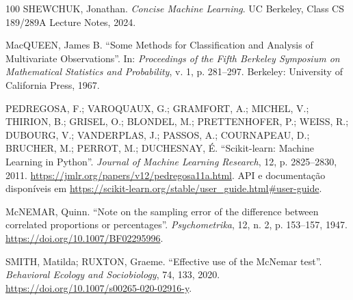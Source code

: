 \documentclass[msc]{on} %
\begin{document}
\begin{thebibliography}{100}
 SHEWCHUK, Jonathan. \textit{Concise Machine Learning}. UC Berkeley, Class CS 189/289A Lecture Notes, 2024.

 MacQUEEN, James B. ``Some Methods for Classification and Analysis of Multivariate Observations''. In: \emph{Proceedings of the Fifth Berkeley Symposium on Mathematical Statistics and Probability}, v. 1, p. 281--297. Berkeley: University of California Press, 1967.

PEDREGOSA, F.; VAROQUAUX, G.; GRAMFORT, A.; MICHEL, V.; THIRION, B.; GRISEL, O.; BLONDEL, M.; PRETTENHOFER, P.; WEISS, R.; DUBOURG, V.; VANDERPLAS, J.; PASSOS, A.; COURNAPEAU, D.; BRUCHER, M.; PERROT, M.; DUCHESNAY, É. ``Scikit-learn: Machine Learning in Python''. \emph{Journal of Machine Learning Research}, 12, p. 2825--2830, 2011. \url{https://jmlr.org/papers/v12/pedregosa11a.html}. API e documentação disponíveis em \url{https://scikit-learn.org/stable/user_guide.html#user-guide}.

McNEMAR, Quinn. ``Note on the sampling error of the difference between correlated proportions or percentages''. \emph{Psychometrika}, 12, n. 2, p. 153--157, 1947. \url{https://doi.org/10.1007/BF02295996}.

SMITH, Matilda; RUXTON, Graeme. ``Effective use of the McNemar test''. \emph{Behavioral Ecology and Sociobiology}, 74, 133, 2020. \url{https://doi.org/10.1007/s00265-020-02916-y}.
%




\end{thebibliography}
\end{document}
